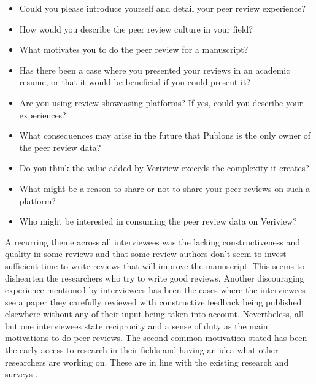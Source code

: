 \begin{itemize}
    \item Could you please introduce yourself and detail your peer review experience?
    \item How would you describe the peer review culture in your field?
    \item What motivates you to do the peer review for a manuscript?
    \item Has there been a case where you presented your reviews in an academic resume, or that it would be beneficial if you could present it?
    \item Are you using review showcasing platforms? If yes, could you describe your experiences?
    \item What consequences may arise in the future that Publons is the only owner of the peer review data?
    \item Do you think the value added by Veriview exceeds the complexity it creates?
    \item What might be a reason to share or not to share your peer reviews on such a platform?
    \item Who might be interested in consuming the peer review data on Veriview?
\end{itemize}

A recurring theme across all interviewees was the lacking constructiveness and quality in some reviews and that some review authors don't seem to invest sufficient time to write reviews that will improve the manuscript. This seems to dishearten the researchers who try to write good reviews. Another discouraging experience mentioned by interviewees has been the cases where the interviewees see a paper they carefully reviewed with constructive feedback being published elsewhere without any of their input being taken into account. Nevertheless, all but one interviewees state reciprocity and a sense of duty as the main motivations to do peer reviews. The second common motivation stated has been the early access to research in their fields and having an idea what other researchers are working on. These are in line with the existing research and surveys \parencite{Publons.2018, Taylor&Francis.2015, Ware.2008, Squazzoni.2013}. 

